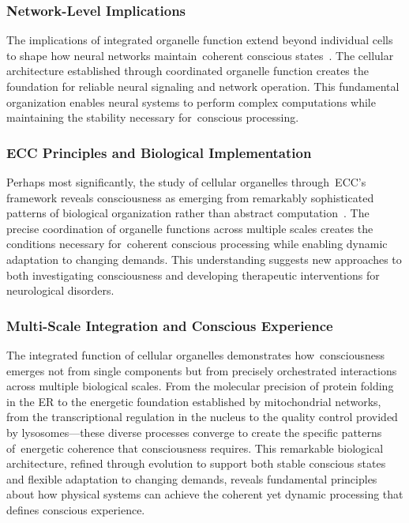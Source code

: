 \subsubsection{Network-Level Implications~~}

The implications of integrated organelle function extend beyond individual cells to shape how neural networks maintain~coherent conscious states~\cite{Harris2012, Verkhratsky2018}. The cellular architecture established through coordinated organelle function creates the foundation for reliable neural signaling and network operation. This fundamental organization enables neural systems to perform complex computations while maintaining the stability necessary for~conscious processing.

\subsubsection{ECC Principles and Biological Implementation~~}

Perhaps most significantly, the study of cellular organelles through~ECC's framework reveals consciousness as emerging from remarkably sophisticated patterns of biological organization rather than abstract computation~\cite{Baluska2016, butlin2023consciousnessartificialintelligenceinsights}. The precise coordination of organelle functions across multiple scales creates the conditions necessary for~coherent conscious processing while enabling dynamic adaptation to changing demands. This understanding suggests new approaches to both investigating consciousness and developing therapeutic interventions for neurological disorders.

\subsubsection{Multi-Scale Integration and Conscious Experience~~}

The integrated function of cellular organelles demonstrates how~consciousness emerges not from single components but from precisely orchestrated interactions across multiple biological scales. From the molecular precision of protein folding in the ER to the energetic foundation established by mitochondrial networks, from the transcriptional regulation in the nucleus to the quality control provided by lysosomes—these diverse processes converge to create the specific patterns of~energetic coherence that consciousness requires. This remarkable biological architecture, refined through evolution to support both stable conscious states and flexible adaptation to changing demands, reveals fundamental principles about how physical systems can achieve the coherent yet dynamic processing that defines conscious experience.


